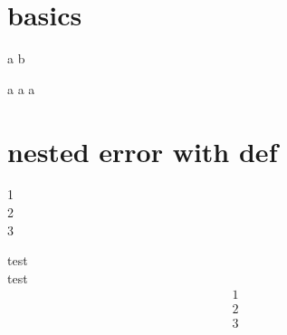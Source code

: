 \documentclass{article}
\begin{document}

\section{basics}

\def\txt{a}
\def\foo{\txt}
\let\bar\foo
\bar
\def\txt{b}
\bar

\def\txt{a}
\def\foo{\txt}
\edef\bar{\foo}
\bar
\def\txt{b}
\bar
\def\foo{c}
\bar


\section{nested error with def}

\newenvironment{condensedalign*}{%
    \let\mylb\\
    \renewcommand{\\}{\mylb[1cm]}

    \let\myhalign\halign
    \def\halign{%
        \let\mylb\\
        \renewcommand{\\}{\mylb[1cm]}
        \myhalign
    }
    test\\
    test
    \par\vspace{0ex}%
    $\aligned
}{
    \endaligned$
    \par\vspace{+1ex}%
    \renewcommand{\\}{\mylb}
}

\begin{condensedalign*}
	1  \\
	2  \\
	3
\end{condensedalign*}
test\\
test
\begin{align*}
	1 \\
	2 \\
	3
\end{align*}
\end{document}
